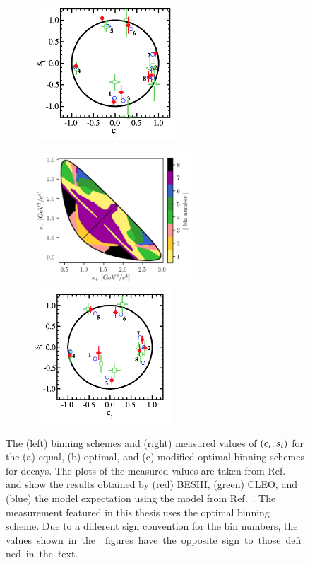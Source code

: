 \begin{figure}[p]
\begin{subfigure}{\columnwidth}
        \includegraphics[height=5cm]{figures/theory/cisi_optimal.png}
        \caption{}
        \label{fig:kspipi_bins_opt}
    \end{subfigure}
    \begin{subfigure}{\columnwidth}
        \centering
        \includegraphics[height=5cm]{figures/theory/binnings/KsPiPi_mod_optimal.png}
        \includegraphics[height=5cm]{figures/theory/cisi_modified_optimal.png}
        \caption{}
        \label{fig:kspipi_bins_modopt}
    \end{subfigure}
    \caption{The (left) binning schemes and (right) measured values of $(c_i,s_i)$ for the (a) equal, (b) optimal, and (c) modified optimal binning schemes for \DtoKspipi decays. The plots of the measured values are taken from Ref.~\cite{BESCISI} and show the results obtained by (red) BESIII, (green) CLEO, and (blue) the model expectation using the model from Ref.~\cite{Belle2018}.
    The measurement featured in this thesis uses the optimal binning scheme. Due to a different sign convention for the bin numbers, the \si values shown in the \besiii figures have the opposite sign to those defined in the text.}
    \label{fig:kspipi_bins}
\end{figure}


